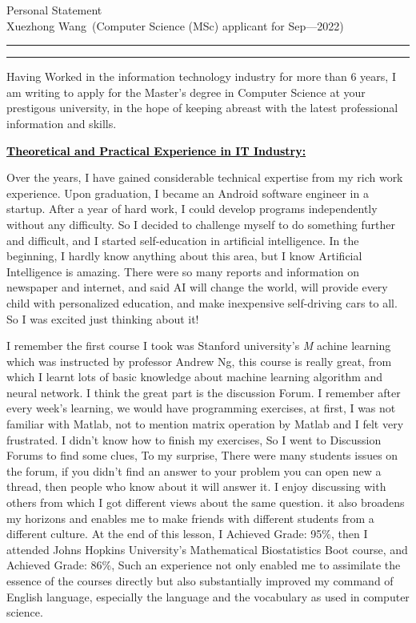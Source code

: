 \documentclass[12pt]{article}
\newcommand{\soptitle}{Personal Statement}
\newcommand{\yourname}{Xuezhong Wang}
\newcommand{\statement}[1]{\par\medskip
  \underline{\textcolor{black}{\textbf{#1:}}}\space
}
\begin{document}
\begin{center}\LARGE\soptitle\\
\large \yourname\ (Computer Science (MSc) applicant for Sep---2022)
\end{center}

\hrule
\vspace{1pt}
\hrule height 1pt


\sffamily
\mdseries



\bigskip

Having Worked in the information technology industry for more than 6 years, I am writing to apply for the Master's degree in Computer Science at your prestigous university, in the hope of keeping abreast with the latest professional information and skills.

\bigskip

\statement{Theoretical and Practical Experience in IT Industry}
Over the years, I have gained considerable technical expertise from my rich work experience. Upon graduation, I became an Android software engineer in a startup. After a year of hard work, I could develop programs independently without any difficulty. So I decided to challenge myself to do something further and difficult, and I started self-education in artificial intelligence. In the beginning, I hardly know anything about this area, but I know Artificial Intelligence is amazing. There were so many reports and information on newspaper and internet, and said AI will change the world, will provide every child with personalized education, and make inexpensive self-driving cars to all. So I was excited just thinking about it! 

\bigskip

I remember the first course I took was Stanford university's \textit{M} achine learning which was instructed by professor Andrew Ng, this course is really great, from which I learnt lots of basic knowledge about machine learning algorithm and neural network. I think the great part is the discussion Forum. I remember after every week's learning, we would have programming exercises, at first, I was not familiar with Matlab, not to mention matrix operation by Matlab and I felt very frustrated. I didn't know how to finish my exercises, So I went to Discussion Forums to find some clues, To my surprise, There were many students issues on the forum, if you didn't find an answer to your problem you can open new a thread, then people who know about it will answer it. I enjoy discussing with others from which I got different views about the same question. it also broadens my horizons and enables me to make friends with different students from a different culture. At the end of this lesson, I Achieved Grade: 95\%, then I attended Johns Hopkins University's Mathematical Biostatistics Boot course, and Achieved Grade: 86\%, Such an experience not only enabled me to assimilate the essence of the courses directly but also substantially improved my command of English language, especially the language and the vocabulary as used in computer science.
\end{document}
